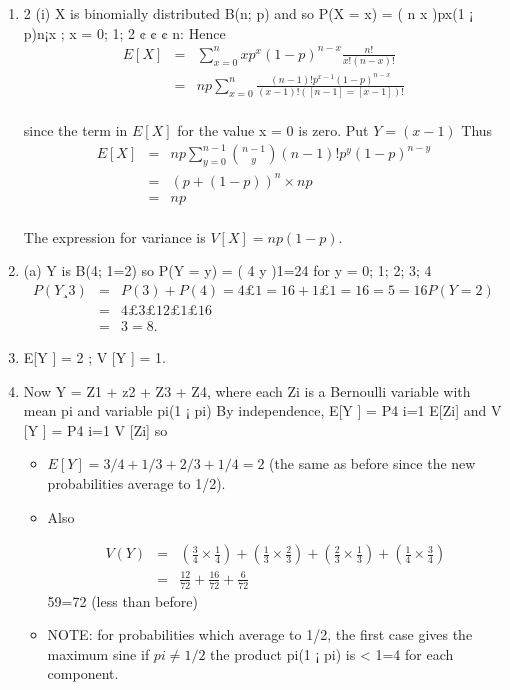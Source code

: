 \documentclass[a4paper,12pt]{article}
\begin{document}
\begin{enumerate}
\item 2 (i) X is binomially distributed B(n; p) and so P(X = x) = ( n
x
)px(1 ¡ p)n¡x ; x =
0; 1; 2 ¢ ¢ ¢ n:
Hence
\begin{eqnarray*}
E[X] 
&=&  \sum^{n}_{x=0}xp^{x} (1-p)^{n-x} \frac{n!}{x!(n-x)!}\\
&=&  np \sum^{n}_{x=0} \frac{(n-1)! p^{x-1}(1-p)^{n-x}}{(x-1)!([n-1]=[x-1])!}\\
\end{eqnarray*}

since the term in $E[X]$ for the value x = 0 is zero. Put $Y = (x - 1)$
Thus
\begin{eqnarray*}
E[X] 
&=&  np \sum^{n-1}_{y=0} {{n-1}\choose y} (n-1)! p^{y}(1-p)^{n-y}\\
&=& (p+(1-p))^n \times np\\
&=& np \\
\end{eqnarray*}

The expression for variance is $V [X] = np(1 - p).$
\item  (a) Y is B(4; 1=2) so P(Y = y) = (
4
y
)1=24 for y = 0; 1; 2; 3; 4
\begin{eqnarray*}
P(Y ¸ 3) &=& P(3) + P(4) = 4 £ 1=16 + 1 £ 1=16 = 5=16
P(Y = 2)\\ &=& 4£3£1 
2£1£16 \\ &=& 3=8.
\end{eqnarray*}
\item E[Y ] = 2 ; V [Y ] = 1.
\item Now Y = Z1 + z2 + Z3 + Z4, where each Zi is a Bernoulli variable with mean pi
and variable pi(1 ¡ pi) By independence, E[Y ] =
P4
i=1
E[Zi] and V [Y ] =
P4
i=1
V [Zi] so
\begin{itemize}
    \item $E[Y ] = 3/4 + 1/3 + 2/3 + 1/4 = 2$ (the same as before since the new probabilities
average to 1/2).
\item Also 

\begin{eqnarray*}
V(Y) &=& \left(\frac{3}{4} \times \frac{1}{4}\right)
+  \left(\frac{1}{3} \times \frac{2}{3}\right)
+  \left(\frac{2}{3} \times \frac{1}{3}\right)
+  \left(\frac{1}{4} \times \frac{3}{4}\right) \\
 &=& \frac{12}{72} +  \frac{16}{72} + \frac{6}{72}
\end{eqnarray*}
59=72 (less than before)
\item NOTE: for probabilities which average to 1/2, the first case gives the maximum sine
if $ pi \neq 1/2$ the product pi(1 ¡ pi) is < 1=4 for each component.
\end{itemize}

\end{enumerate}
\end{document}
